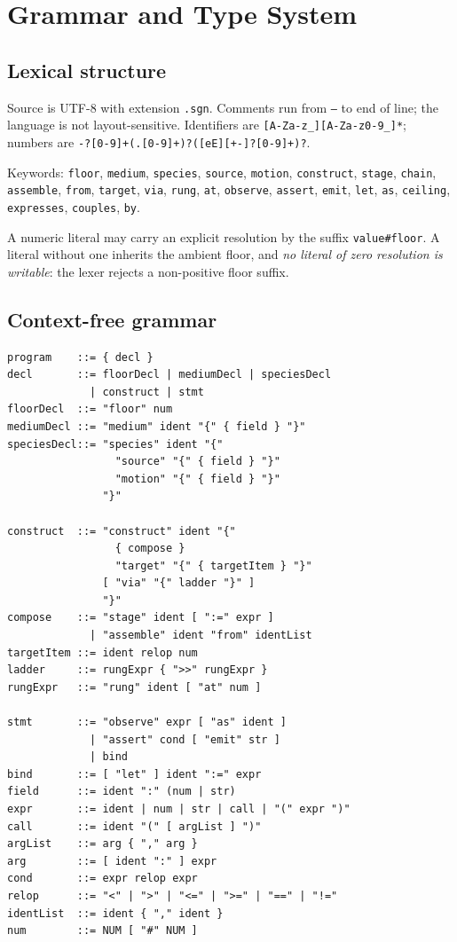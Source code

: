 \documentclass[11pt,twocolumn,a4paper]{article}
\theoremstyle{definition}
\theoremstyle{remark}
\begin{document}
\section{Grammar and Type System}
\label{sec:grammar}

\subsection{Lexical structure}

Source is UTF-8 with extension \texttt{.sgn}. Comments run from \texttt{--} to
end of line; the language is not layout-sensitive. Identifiers are
\texttt{[A-Za-z\_][A-Za-z0-9\_]*}; numbers are
\texttt{-?[0-9]+(.[0-9]+)?([eE][+-]?[0-9]+)?}.

Keywords: \texttt{floor}, \texttt{medium}, \texttt{species}, \texttt{source},
\texttt{motion}, \texttt{construct}, \texttt{stage}, \texttt{chain},
\texttt{assemble}, \texttt{from}, \texttt{target}, \texttt{via}, \texttt{rung},
\texttt{at}, \texttt{observe}, \texttt{assert}, \texttt{emit}, \texttt{let},
\texttt{as}, \texttt{ceiling}, \texttt{expresses}, \texttt{couples},
\texttt{by}.

A numeric literal may carry an explicit resolution by the suffix
\texttt{value\#floor}. A literal without one inherits the ambient floor, and
\emph{no literal of zero resolution is writable}: the lexer rejects a
non-positive floor suffix.

\subsection{Context-free grammar}

\begin{lstlisting}[caption={Sangoma grammar (EBNF).},label={lst:ebnf}]
program    ::= { decl }
decl       ::= floorDecl | mediumDecl | speciesDecl
             | construct | stmt
floorDecl  ::= "floor" num
mediumDecl ::= "medium" ident "{" { field } "}"
speciesDecl::= "species" ident "{"
                 "source" "{" { field } "}"
                 "motion" "{" { field } "}"
               "}"

construct  ::= "construct" ident "{"
                 { compose }
                 "target" "{" { targetItem } "}"
               [ "via" "{" ladder "}" ]
               "}"
compose    ::= "stage" ident [ ":=" expr ]
             | "assemble" ident "from" identList
targetItem ::= ident relop num
ladder     ::= rungExpr { ">>" rungExpr }
rungExpr   ::= "rung" ident [ "at" num ]

stmt       ::= "observe" expr [ "as" ident ]
             | "assert" cond [ "emit" str ]
             | bind
bind       ::= [ "let" ] ident ":=" expr
field      ::= ident ":" (num | str)
expr       ::= ident | num | str | call | "(" expr ")"
call       ::= ident "(" [ argList ] ")"
argList    ::= arg { "," arg }
arg        ::= [ ident ":" ] expr
cond       ::= expr relop expr
relop      ::= "<" | ">" | "<=" | ">=" | "==" | "!="
identList  ::= ident { "," ident }
num        ::= NUM [ "#" NUM ]
\end{lstlisting}
\end{document}
